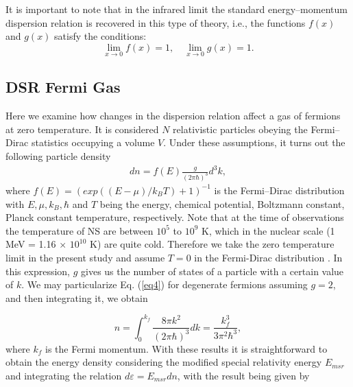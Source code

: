 \documentclass[final,5p,times,twocolumn]{elsarticle}
\begin{document}


It is important to note that in the infrared limit the standard energy--momentum dispersion relation is recovered in this type of theory, i.e., the functions $f(x)$ and $g(x)$  satisfy the
conditions:
\begin{equation}
    \lim_{x\rightarrow 0} f(x)=1, \quad \lim_{x \rightarrow 0} g(x)=1.
    \label{eq3}
\end{equation}

\subsection{DSR Fermi Gas}\label{fermi}
Here we examine how changes in the dispersion relation affect a gas of fermions at zero temperature. It is considered $N$ relativistic particles obeying the Fermi--Dirac statistics occupying a volume $V$. Under these assumptions, it turns out the following particle density \cite{dispersao9}
\begin{align}
    dn=f(E)\frac{g}{(2\pi \hbar )^3}d^3k,
    \label{eq4}
\end{align}
where $f(E)=(exp((E-\mu)/k_BT)+1)^{-1}$ is the Fermi--Dirac distribution with $E,\mu,k_B,\hbar$ and $T$ being the energy, chemical potential, Boltzmann constant, Planck constant temperature, respectively. 
Note that at the time of observations the temperature of NS are between $10^{5}$ to $10^{9}$ K, which in the nuclear scale (1 MeV = 1.16 $\times$ $10^{10}$ K) are quite cold. Therefore we take the zero temperature limit in the present study and assume $T=0$ in the Fermi-Dirac distribution \cite{Glendenning1997}. 
In this expression, $g$ gives us the number of states of a particle with a certain value of $k$. We may particularize Eq. (\ref{eq4}) for degenerate fermions assuming $g=2$, and then integrating it, we obtain

\begin{equation}
    n= \int_{0}^{k_f}\frac{8 \pi k^2}{(2 \pi \hbar)^3} dk=\frac{k_{f}^{3}}{3\pi^{2}\hbar^{3}},
    \label{eq5}
\end{equation}
where $k_f$ is the Fermi momentum. With these results it is straightforward to obtain the energy density considering the modified special relativity energy $E_{msr}$ and integrating the relation $d \varepsilon= E_{msr} dn$, with the result being given by
\end{document}
